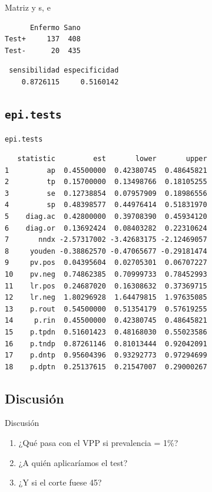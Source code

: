 \documentclass[
  ignorenonframetext,
  aspectratio=169,
]{beamer}
\providecommand{\tightlist}{%
  \setlength{\itemsep}{0pt}\setlength{\parskip}{0pt}}
\begin{document}
\begin{frame}[fragile]{Matriz y s, e}
\begin{verbatim}
      Enfermo Sano
Test+     137  408
Test-      20  435
\end{verbatim}

\begin{verbatim}
 sensibilidad especificidad 
    0.8726115     0.5160142 
\end{verbatim}
\end{frame}

\begin{frame}
\end{frame}

\subsection{\texorpdfstring{\texttt{epi.tests}}{epi.tests}}\label{epi.tests}

\begin{frame}[fragile]{\texttt{epi.tests}}
\begin{verbatim}
   statistic         est       lower       upper
1         ap  0.45500000  0.42380745  0.48645821
2         tp  0.15700000  0.13498766  0.18105255
3         se  0.12738854  0.07957909  0.18986556
4         sp  0.48398577  0.44976414  0.51831970
5    diag.ac  0.42800000  0.39708390  0.45934120
6    diag.or  0.13692424  0.08403282  0.22310624
7       nndx -2.57317002 -3.42683175 -2.12469057
8     youden -0.38862570 -0.47065677 -0.29181474
9     pv.pos  0.04395604  0.02705301  0.06707227
10    pv.neg  0.74862385  0.70999733  0.78452993
11    lr.pos  0.24687020  0.16308632  0.37369715
12    lr.neg  1.80296928  1.64479815  1.97635085
13    p.rout  0.54500000  0.51354179  0.57619255
14     p.rin  0.45500000  0.42380745  0.48645821
15    p.tpdn  0.51601423  0.48168030  0.55023586
16    p.tndp  0.87261146  0.81013444  0.92042091
17    p.dntp  0.95604396  0.93292773  0.97294699
18    p.dptn  0.25137615  0.21547007  0.29000267
\end{verbatim}
\end{frame}

\begin{frame}
\end{frame}

\subsection{Discusión}\label{discusiuxf3n}

\begin{frame}{Discusión}
\begin{enumerate}
\tightlist
\item
  ¿Qué pasa con el VPP si prevalencia = 1\%?
\item
  ¿A quién aplicaríamos el test?
\item
  ¿Y si el corte fuese 45?
\end{enumerate}
\end{frame}
\end{document}
